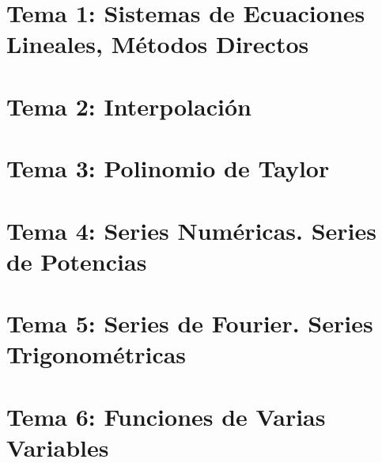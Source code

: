 \renewcommand{\contentsname}{Indice}
\tableofcontents
\newpage
\section{Tema 1: Sistemas de Ecuaciones Lineales, Métodos Directos}

\newpage
\section{Tema 2: Interpolación}

\newpage
\section{Tema 3: Polinomio de Taylor}

\newpage
\section{Tema 4: Series Numéricas. Series de Potencias}

\newpage
\section{Tema 5: Series de Fourier. Series Trigonométricas}

\newpage
\section{Tema 6: Funciones de Varias Variables}
